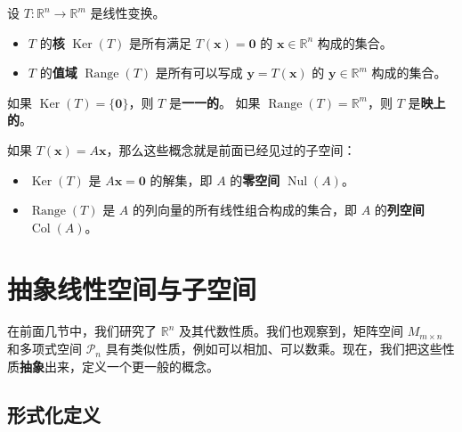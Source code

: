 \begin{definition}[核与值域]
设 $T:\mathbb{R}^n\to\mathbb{R}^m$ 是线性变换。
\begin{itemize}
    \item $T$ 的\textbf{核} $\operatorname{Ker}(T)$ 是所有满足 $T(\mathbf{x})=\mathbf{0}$ 的 $\mathbf{x}\in\mathbb{R}^n$ 构成的集合。
    \item $T$ 的\textbf{值域} $\operatorname{Range}(T)$ 是所有可以写成 $\mathbf{y}=T(\mathbf{x})$ 的 $\mathbf{y}\in\mathbb{R}^m$ 构成的集合。
\end{itemize}
如果 $\operatorname{Ker}(T)=\{\mathbf{0}\}$，则 $T$ 是\textbf{一一的}。
如果 $\operatorname{Range}(T)=\mathbb{R}^m$，则 $T$ 是\textbf{映上的}。
\end{definition}
如果 $T(\mathbf{x})=A\mathbf{x}$，那么这些概念就是前面已经见过的子空间：
\begin{itemize}
    \item $\operatorname{Ker}(T)$ 是 $A\mathbf{x}=\mathbf{0}$ 的解集，即 $A$ 的\textbf{零空间} $\operatorname{Nul}(A)$。
    \item $\operatorname{Range}(T)$ 是 $A$ 的列向量的所有线性组合构成的集合，即 $A$ 的\textbf{列空间} $\operatorname{Col}(A)$。
\end{itemize}

\section{抽象线性空间与子空间}
在前面几节中，我们研究了 $\mathbb{R}^n$ 及其代数性质。我们也观察到，矩阵空间 $M_{m\times n}$ 和多项式空间 $\mathcal{P}_n$ 具有类似性质，例如可以相加、可以数乘。现在，我们把这些性质\textbf{抽象}出来，定义一个更一般的概念。

\subsection{形式化定义}

